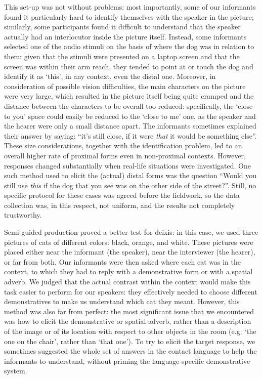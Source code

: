 \documentclass[output=paper,hidelinks]{langscibook}
\begin{document}
This set-up was not without problems: most importantly, some of our informants found it particularly hard to identify themselves with the speaker in the picture; similarly, some participants found it difficult to understand that the speaker actually had an interlocutor inside the picture itself. Instead, some informants selected one of the audio stimuli on the basis of where the dog was in relation to them: given that the stimuli were presented on a laptop screen and that the screen was within their arm reach, they tended to point at or touch the dog and identify it as ‘this’, in any context, even the distal one. Moreover, in consideration of possible vision difficulties, the main characters on the picture were very large, which resulted in the picture itself being quite cramped and the distance between the characters to be overall too reduced: specifically, the ‘close to you’ space could easily be reduced to the ‘close to me’ one, as the speaker and the hearer were only a small distance apart. The informants sometimes explained their answer by saying: “it’s still close, if it were \textit{that} it would be something else”. These size considerations, together with the identification problem, led to an overall higher rate of proximal forms even in non-proximal contexts. However, responses changed substantially when real-life situations were investigated. One such method used to elicit the (actual) distal forms was the question ``Would you still use \textit{this} if the dog that you see was on the other side of the street?''. Still, no specific protocol for these cases was agreed before the fieldwork, so the data collection was, in this respect, not uniform, and the results not completely trustworthy.

Semi-guided production proved a better test for deixis: in this case, we used three pictures of cats of different colors: black, orange, and white. These pictures were placed either near the informant (the speaker), near the interviewer (the hearer), or far from both. Our informants were then asked where each cat was in the context, to which they had to reply with a demonstrative form or with a spatial adverb. We judged that the actual contrast within the context would make this task easier to perform for our speakers: they effectively needed to choose different demonstratives to make us understand which cat they meant. However, this method was also far from perfect: the most significant issue that we encountered was how to elicit the demonstrative or spatial adverb, rather than a description of the image or of its location with respect to other objects in the room (e.g. ‘the one on the chair’, rather than ‘that one’). To try to elicit the target response, we sometimes suggested the whole set of answers in the contact language to help the informants to understand, without priming the language-specific demonstrative system.
\end{document}
